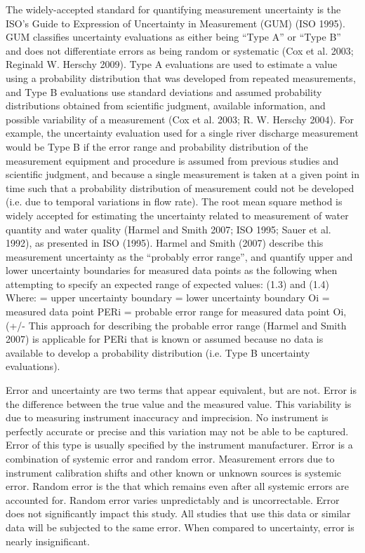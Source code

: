 \begin{linenumbers}
The widely-accepted standard for quantifying measurement uncertainty is the ISO’s Guide to Expression of Uncertainty in Measurement (GUM) (ISO 1995).  GUM classifies uncertainty evaluations as either being “Type A” or “Type B” and does not differentiate errors as being random or systematic (Cox et al. 2003; Reginald W. Herschy 2009).  Type A evaluations are used to estimate a value using a probability distribution that was developed from repeated measurements, and Type B evaluations use standard deviations and assumed probability distributions obtained from scientific judgment, available information, and possible variability of a measurement (Cox et al. 2003; R. W. Herschy 2004).  For example, the uncertainty evaluation used for a single river discharge measurement would be Type B if the error range and probability distribution of the measurement equipment and procedure is assumed from previous studies and scientific judgment, and because a single measurement is taken at a given point in time such that a probability distribution of measurement could not be developed (i.e. due to temporal variations in flow rate).
The root mean square method is widely accepted for estimating the uncertainty related to measurement of water quantity and water quality (Harmel and Smith 2007; ISO 1995; Sauer et al. 1992), as presented in ISO (1995).  Harmel and Smith (2007) describe this measurement uncertainty as the “probably error range”, and quantify upper and lower uncertainty boundaries for measured data points as the following when attempting to specify an expected range of expected values:
(1.3)
and
(1.4)
Where:	 = upper uncertainty boundary
= lower uncertainty boundary
Oi = measured data point
PERi = probable error range for measured data point Oi, (+/- %
This approach for describing the probable error range (Harmel and Smith 2007) is applicable for PERi that is known or assumed because no data is available to develop a probability distribution (i.e. Type B uncertainty evaluations).










Error and uncertainty are two terms that appear equivalent, but are not.  Error is the difference between the true value and the measured value.  This variability is due to measuring instrument inaccuracy and imprecision.  No instrument is perfectly accurate or precise and this variation may not be able to be captured.  Error of this type is usually specified by the instrument manufacturer.  Error is a combination of systemic error and random error.  Measurement errors due to instrument calibration shifts and other known or unknown sources is systemic error.  Random error is the that which remains even after all systemic errors are accounted for.  Random error varies unpredictably and is uncorrectable.  Error does not significantly impact this study.  All studies that use this data or similar data will be subjected to the same error.  When compared to uncertainty, error is nearly insignificant.


\end{linenumbers}
